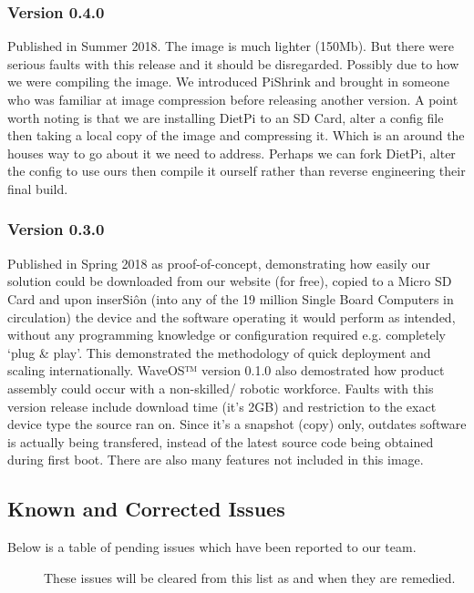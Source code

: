 \documentclass[letterpaper,10pt,english]{sphinxmanual}
\begin{document}
\subsubsection{Version 0.4.0}
\label{\detokenize{releasenotes:version-0-4-0}}
Published in Summer 2018. The image is much lighter (150Mb). But there were serious faults with this release and it should be disregarded. Possibly due to how we were compiling the image. We introduced PiShrink and brought in someone who was familiar at image compression before releasing another version. A point worth noting is that we are installing DietPi to an SD Card, alter a config file then taking a local copy of the image and compressing it. Which is an around the houses way to go about it we need to address. Perhaps we can fork DietPi, alter the config to use ours then compile it ourself rather than reverse engineering their final build.


\subsubsection{Version 0.3.0}
\label{\detokenize{releasenotes:version-0-3-0}}
Published in Spring 2018 as proof-of-concept, demonstrating how easily our solution could be downloaded from our website (for free), copied to a Micro SD Card and upon inserSiôn (into any of the 19 million Single Board Computers in circulation) the device and the software operating it would perform as intended, without any programming knowledge or configuration required e.g. completely ‘plug \& play’. This demonstrated the methodology of quick deployment and scaling internationally. WaveOS™ version 0.1.0 also demostrated how product assembly could occur with a non-skilled/ robotic workforce. Faults with this version release include download time (it’s 2GB) and restriction to the exact device type the source ran on. Since it’s a snapshot (copy) only, outdates software is actually being transfered, instead of the latest source code being obtained during first boot. There are also many features not included in this image.


\subsection{Known and Corrected Issues}
\label{\detokenize{releasenotes:known-and-corrected-issues}}\begin{description}
\item[{Below is a table of pending issues which have been reported to our team.}] \leavevmode
These issues will be cleared from this list as and when they are remedied.

\end{description}
\end{document}
